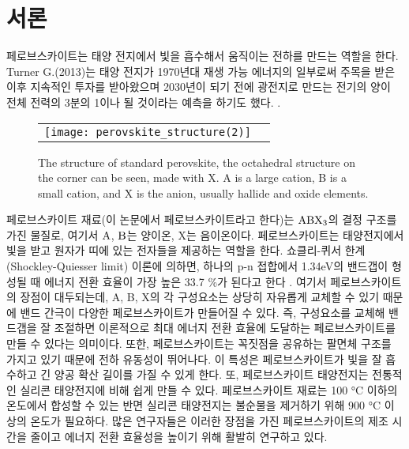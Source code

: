 
\section{서론}

페로브스카이트는 태양 전지에서 빛을 흡수해서 움직이는 전하를 만드는 역할을 한다. Turner G.(2013)는 태양 전지가 1970년대 재생 가능 에너지의 일부로써 주목을 받은 이후 지속적인 투자를 받아왔으며 2030년이 되기 전에 광전지로 만드는 전기의 양이 전체 전력의 3분의 1이나 될 것이라는 예측을 하기도 했다. \cite{turner2013global}.

\begin{figure}[h!]
	\begin{center}
		\begin{tabular}{cc}
			\texttt{[image: perovskite\_structure(2)]} 
		\end{tabular}
		\caption{The structure of standard perovskite, the octahedral structure on the corner can be seen, made with X. A is a large cation, B is a small cation, and X is the anion, usually hallide and oxide elements.}	
		\label{fig:FIR101}
	\end{center}
\end{figure}

페로브스카이트 재료(이 논문에서 페로브스카이트라고 한다)는 $\rm{ABX_3}$의 결정 구조를 가진 물질로, 여기서 $\rm{A}$, $\rm{B}$는 양이온, X는 음이온이다. 페로브스카이트는 태양전지에서 빛을 받고 원자가 띠에 있는 전자들을 제공하는 역할을 한다. 쇼클리-퀴서 한계(Shockley-Quiesser limit) 이론에 의하면, 하나의 p-n 접합에서 1.34eV의 밴드갭이 형성될 때 에너지 전환 효율이 가장 높은 33.7 \%가 된다고 한다 \cite{ruhle2016tabulated}. 여기서 페로브스카이트의 장점이 대두되는데, A, B, X의 각 구성요소는 상당히 자유롭게 교체할 수 있기 때문에 밴드 간극이  다양한 페로브스카이트가 만들어질 수 있다. 즉, 구성요소를 교체해 밴드갭을 잘 조절하면 이론적으로 최대 에너지 전환 효율에 도달하는 페로브스카이트를 만들 수 있다는 의미이다. 또한, 페로브스카이트는 꼭짓점을 공유하는 팔면체 구조를 가지고 있기 때문에 전하 유동성이 뛰어나다\cite{linaburg2015studies}. 이 특성은 페로브스카이트가 빛을 잘 흡수하고 긴 양공 확산 길이를 가질 수 있게 한다\cite{green2014emergence}. 또, 페로브스카이트 태양전지는 전통적인 실리콘 태양전지에 비해 쉽게 만들 수 있다. 페로브스카이트 재료는 100 °C 이하의 온도에서 합성할 수 있는 반면 실리콘 태양전지는 불순물을 제거하기 위해 900 °C 이상의 온도가 필요하다.
많은 연구자들은 이러한 장점을 가진 페로브스카이트의 제조 시간을 줄이고 에너지 전환 효율성을 높이기 위해 활발히 연구하고 있다.

